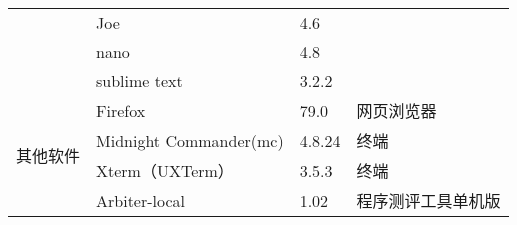 \begin{table}[H]
\begin{tabular}{|l|l|l|l|}
		& Joe                     & 4.6            &                         \\ \cline{2-4} 
		& nano                    & 4.8            &                         \\ \cline{2-4} 
		& sublime text            & 3.2.2          &                         \\ \hline
		\multirow{4}{*}{其他软件}   & Firefox                 & 79.0           & 网页浏览器                   \\ \cline{2-4} 
		& Midnight Commander(mc)  & 4.8.24         & 终端                      \\ \cline{2-4} 
		& Xterm（UXTerm）           & 3.5.3          & 终端                      \\ \cline{2-4} 
		& Arbiter-local           & 1.02           & 程序测评工具单机版               \\ \hline
	\end{tabular}
\end{table}


